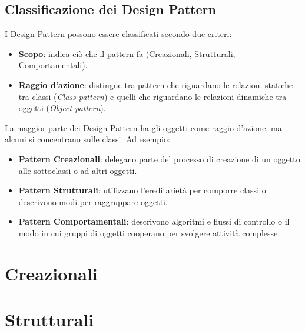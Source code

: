 \subsection{Classificazione dei Design Pattern}
I Design Pattern possono essere classificati secondo due criteri:
\begin{itemize}
    \item \textbf{Scopo}: indica ciò che il pattern fa (Creazionali, Strutturali, Comportamentali).
    \item \textbf{Raggio d’azione}: distingue tra pattern che riguardano le relazioni statiche tra classi (\textit{Class-pattern}) e quelli che riguardano le relazioni dinamiche tra oggetti (\textit{Object-pattern}).
\end{itemize}

La maggior parte dei Design Pattern ha gli oggetti come raggio d’azione, ma alcuni si concentrano sulle classi. Ad esempio:
\begin{itemize}
    \item \textbf{Pattern Creazionali}: delegano parte del processo di creazione di un oggetto alle sottoclassi o ad altri oggetti.
    \item \textbf{Pattern Strutturali}: utilizzano l’ereditarietà per comporre classi o descrivono modi per raggruppare oggetti.
    \item \textbf{Pattern Comportamentali}: descrivono algoritmi e flussi di controllo o il modo in cui gruppi di oggetti cooperano per svolgere attività complesse.
\end{itemize}

\newpage

\section{Creazionali}







\section{Strutturali}









